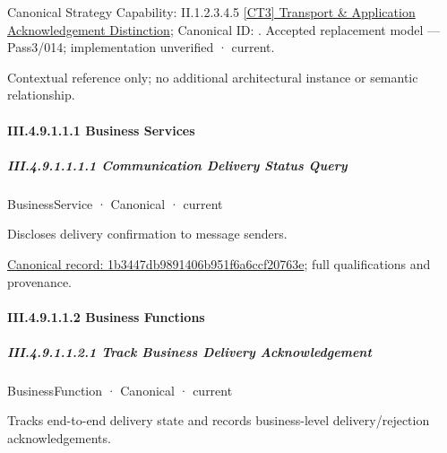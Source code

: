 {\small Canonical Strategy Capability: II.1.2.3.4.5 \hyperref[element:f726b4cecd714ab084e6cce3b0874e85]{[CT3] Transport \& Application Acknowledgement Distinction}; Canonical ID: \texttt{}. Accepted replacement model — Pass3/014; implementation unverified · current.}\par
Contextual reference only; no additional architectural instance or semantic relationship.\par
\paragraph*{III.4.9.1.1.1 Business Services}
\label{navigation:III.4.9.1.1.1}

\subparagraph*{III.4.9.1.1.1.1 Communication Delivery Status Query}
\label{navigation:III.4.9.1.1.1.1}

\label{element:1b3447db9891406b951f6a6ccf20763e}
{\small BusinessService · Canonical · current}\par

Discloses delivery confirmation to message senders.


{\footnotesize \href{../../../../../../../continuum/business/business-service/1b3447db9891406b951f6a6ccf20763e.md}{Canonical record: 1b3447db9891406b951f6a6ccf20763e}; full qualifications and provenance.}\par
\paragraph*{III.4.9.1.1.2 Business Functions}
\label{navigation:III.4.9.1.1.2}

\subparagraph*{III.4.9.1.1.2.1 Track Business Delivery Acknowledgement}
\label{navigation:III.4.9.1.1.2.1}

\label{element:75fb22db4c2346b99fd7c788264abb5d}
{\small BusinessFunction · Canonical · current}\par

Tracks end-to-end delivery state and records business-level delivery/rejection acknowledgements.


